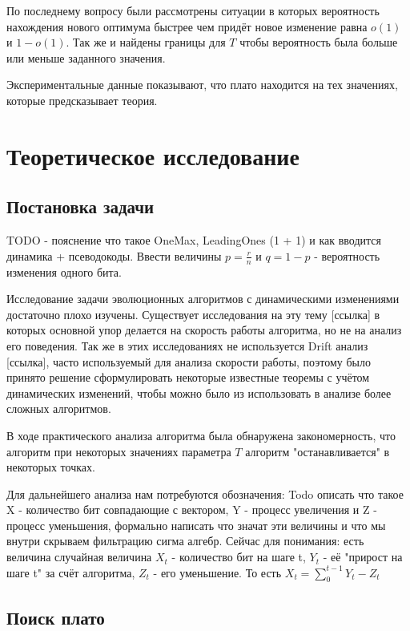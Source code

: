 \documentclass[times,specification,annotation]{itmo-student-thesis}
\begin{document}
    По последнему вопросу были рассмотрены ситуации в которых вероятность нахождения нового оптимума быстрее чем придёт новое изменение равна $o(1)$ и $1 - o(1)$.
    Так же и найдены границы для $T$ чтобы вероятность была больше или меньше заданного значения.

    Экспериментальные данные показывают, что плато находится на тех значениях, которые предсказывает теория.

    \chapter{Теоретическое исследование}

    \section{Постановка задачи}
    TODO - пояснение что такое OneMax, LeadingOnes (1 + 1) и как вводится динамика + псеводокоды. Ввести величины $p = \frac{r}{n}$ и $q = 1 - p$ - вероятность изменения одного бита.

    Исследование задачи эволюционных алгоритмов с динамическими изменениями достаточно плохо изучены.
    Существует исследования на эту тему [ссылка] в которых основной упор делается на скорость работы алгоритма, но не на анализ его поведения.
    Так же в этих исследованиях не используется Drift анализ [ссылка], часто используемый для анализа скорости работы,
    поэтому было принято решение сформулировать некоторые известные теоремы с учётом динамических изменений, чтобы можно было из использовать в анализе более сложных алгоритмов.

    В ходе практического анализа алгоритма была обнаружена закономерность, что алгоритм при некоторых значениях параметра $T$ алгоритм "останавливается" в некоторых точках.

    Для дальнейшего анализа нам потребуются обозначения:
    Todo описать что такое X - количество бит совпадающие с вектором, Y - процесс увеличения и Z - процесс уменьшения, формально написать что значат эти величины и что мы внутри скрываем фильтрацию сигма алгебр.
    Сейчас для понимания: есть величина случайная величина $X_t$ - количество бит на шаге t, $Y_t$ - её "прирост на шаге t" за счёт алгоритма, $Z_t$ - его уменьшение.
    То есть $X_t = \sum_{0}^{t - 1} Y_t - Z_t $
    \section{Поиск плато}
\end{document}
